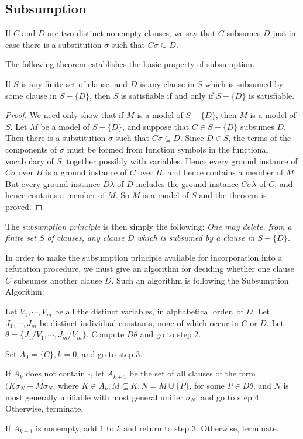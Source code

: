\documentclass[8pt]{extarticle}
\providecommand{\customgenericname}{}
\newcommand{\newcustomtheorem}[2]{%
  \newenvironment{#1}[1]
  {%
   \renewcommand\customgenericname{#2}%
   \renewcommand\theinnercustomgeneric{##1}%
   \innercustomgeneric
  }
  {\endinnercustomgeneric}
}
\begin{document}
\subsection{Subsumption}
If $C$ and $D$ are two distinct nonempty clauses, we say 
that $C$ subsumes $D$ just in case there is a substitution $\sigma$ such that $C\sigma\subseteq D$.

The following theorem establishes the basic property of subsumption. 

\newcustomtheorem{p16theorem}{}
\begin{p16theorem}{Subsumption Theorem}
If $S$ is any finite set of clause. and $D$ is any clause in $S$ which is subsumed by some clause in $S - \{D\}$, then $S$ is satisfiable if and only if $S - \{D\}$ is satisfiable.
\end{p16theorem}
\begin{proof}
We need only show that if $M$ is a model of $S - \{D\}$, then $M$ is a model of $S$. Let $M$ be a model of $S - \{D\}$, and suppose that $C \in S - \{D\}$ subsumes $D$. Then there is a substitution $\sigma$ such that $C\sigma\subseteq D$. Since $D \in S$, the 
terms of the components of $\sigma$ must be formed from function symbols in the functional vocabulary of $S$, together possibly with variables. Hence every ground instance of $C\sigma$ over $H$ is a ground instance of $C$ over $H$, and hence contains a 
member of $M$. But every ground instance $D\lambda$ of $D$ includes the ground instance $C\sigma\lambda$ of $C$, and hence contains a member of $M$. So $M$ is a model of $S$ and the theorem is proved. 

\end{proof}

\newpage
The \emph{subsumption principle} is then simply the following: \emph{One may delete, from a
finite set $S$ of clauses, any clause $D$ which is subsumed by a clause in $S - \{D\}$.}

In order to make the subsumption principle available for incorporation into a 
refutation procedure, we must give an algorithm for deciding whether one clause $C$ 
subsumes another clause $D$. Such an algorithm is following the Subsumption Algorithm:

\begin{steps}
    \item Let $V_1,\dotsm,V_m$ be all the distinct variables, in alphabetical order, of $D$. Let $J_1,\dotsm,J_m$ be distinct individual constants, none of which occur in $C$ or $D$. Let $\theta = \{J_1/V_1,\dotsm,J_m/V_m\}$. Compute $D\theta$ and go to step 2.
    \item Set $A_0 = \{C\}, k = 0$, and go to step 3.
    \item If $A_k$ does not contain $\square$, let $A_{k+1}$ be the set of all clauses of the form $(K\sigma_N - M\sigma_N$, where $K \in A_k, M\subseteq K, N = M \cup \{P\}$, for some $P \in D\theta$, and $N$ is most generally unifiable with most general unifier $\sigma_N$; and go to step 4. Otherwise, terminate.
    \item If $A_{k+1}$ is nonempty, add $1$ to $k$ and return to step 3. Otherwise, terminate.
\end{steps}
\end{document}
